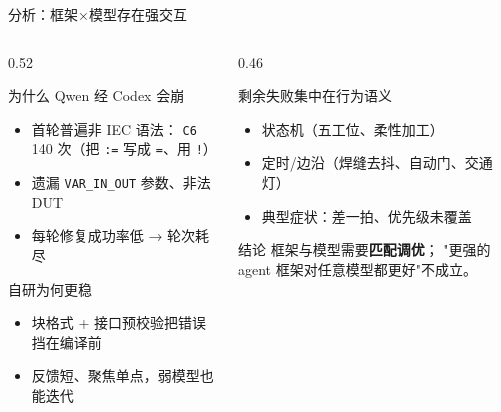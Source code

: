 \documentclass[10pt,aspectratio=169]{beamer}
\begin{document}
\begin{frame}{分析：框架×模型存在强交互}
	\begin{columns}[T]
		\begin{column}{0.52\textwidth}
			\begin{block}{为什么 Qwen 经 Codex 会崩}
				\begin{itemize}
					\item 首轮普遍非 IEC 语法：
					      \texttt{C6} 140 次（把 \texttt{:=} 写成 \texttt{=}、用 \texttt{!}）
					\item 遗漏 \texttt{VAR\_IN\_OUT} 参数、非法 DUT
					\item 每轮修复成功率低 → 轮次耗尽
				\end{itemize}
			\end{block}
			\begin{block}{自研为何更稳}
				\begin{itemize}
					\item 块格式 + 接口预校验把错误挡在编译前
					\item 反馈短、聚焦单点，弱模型也能迭代
				\end{itemize}
			\end{block}
		\end{column}
		\begin{column}{0.46\textwidth}
			\begin{block}{剩余失败集中在行为语义}
				\begin{itemize}
					\item 状态机（五工位、柔性加工）
					\item 定时/边沿（焊缝去抖、自动门、交通灯）
					\item 典型症状：差一拍、优先级未覆盖
				\end{itemize}
			\end{block}
			\begin{alertblock}{结论}
				框架与模型需要\textbf{匹配调优}；
				"更强的 agent 框架对任意模型都更好"不成立。
			\end{alertblock}
		\end{column}
	\end{columns}
\end{frame}
\end{document}
